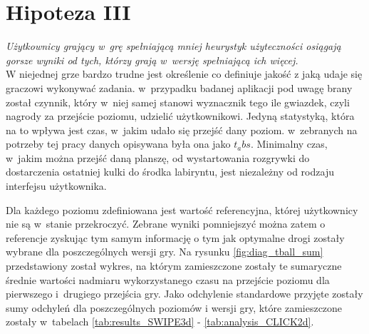 \documentclass[a4paper,12pt,numbers=noenddot]{report}
\begin{document}
\section{Hipoteza III}
\textit{Użytkownicy grający w~grę spełniającą mniej heurystyk użyteczności osiągają gorsze wyniki od tych, którzy grają w~wersję spełniającą ich więcej.}\\

W niejednej grze bardzo trudne jest określenie co definiuje jakość z jaką udaje się graczowi wykonywać zadania. w~przypadku badanej aplikacji pod uwagę brany został czynnik, który w~niej samej stanowi wyznacznik tego ile gwiazdek, czyli nagrody za przejście poziomu, udzielić użytkownikowi. Jedyną statystyką, która na to wpływa jest czas, w~jakim udało się przejść dany poziom. w~zebranych na potrzeby tej pracy danych opisywana była ona jako $t_abs$. Minimalny czas, w~jakim można przejść daną planszę, od wystartowania rozgrywki do dostarczenia ostatniej kulki do środka labiryntu, jest niezależny od rodzaju interfejsu użytkownika. 

Dla każdego poziomu zdefiniowana jest wartość referencyjna, której użytkownicy nie są w~stanie przekroczyć. Zebrane wyniki pomniejszyć można zatem o referencje zyskując tym samym informację o tym jak optymalne drogi zostały wybrane dla poszczególnych wersji gry. Na rysunku \ref{fig:diag_tball_sum} przedstawiony został wykres, na którym zamieszczone zostały te sumaryczne średnie wartości nadmiaru wykorzystanego czasu na przejście poziomu dla pierwszego i~drugiego przejścia gry. Jako odchylenie standardowe przyjęte zostały sumy odchyleń dla poszczególnych poziomów i wersji gry, które zamieszczone zostały w~tabelach \ref{tab:results_SWIPE3d} - \ref{tab:analysis_CLICK2d}.\\
\end{document}
